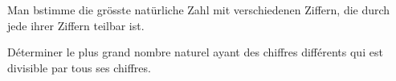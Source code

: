 Man bstimme die grösste natürliche Zahl mit verschiedenen Ziffern, die durch jede ihrer Ziffern teilbar ist.

\bigskip

Déterminer le plus grand nombre naturel ayant des chiffres différents qui est divisible par tous ses chiffres.